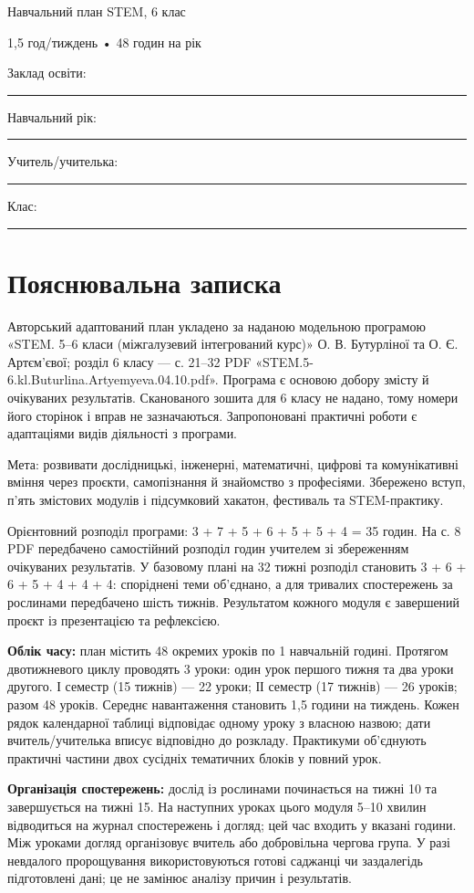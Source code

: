 \documentclass[10pt,a4paper,landscape]{article}
\begin{document}
{\LARGE\color{accent} Навчальний план STEM, 6 клас}

{\large 1,5 год/тиждень • 48 годин на рік}

Заклад освіти: \rule{90mm}{0.3pt}\quad Навчальний рік: \rule{30mm}{0.3pt}

Учитель/учителька: \rule{95mm}{0.3pt}\quad Клас: \rule{25mm}{0.3pt}
\section*{Пояснювальна записка}
Авторський адаптований план укладено за наданою модельною програмою «STEM. 5--6 класи (міжгалузевий інтегрований курс)» О. В. Бутурліної та О. Є. Артєм’євої; розділ 6 класу — с. 21--32 PDF «STEM.5-6.kl.Buturlina.Artyemyeva.04.10.pdf». Програма є основою добору змісту й очікуваних результатів. Сканованого зошита для 6 класу не надано, тому номери його сторінок і вправ не зазначаються. Запропоновані практичні роботи є адаптаціями видів діяльності з програми.

Мета: розвивати дослідницькі, інженерні, математичні, цифрові та комунікативні вміння через проєкти, самопізнання й знайомство з професіями. Збережено вступ, п’ять змістових модулів і підсумковий хакатон, фестиваль та STEM-практику.

Орієнтовний розподіл програми: 3 + 7 + 5 + 6 + 5 + 5 + 4 = 35 годин. На с. 8 PDF передбачено самостійний розподіл годин учителем зі збереженням очікуваних результатів. У базовому плані на 32 тижні розподіл становить 3 + 6 + 6 + 5 + 4 + 4 + 4: споріднені теми об’єднано, а для тривалих спостережень за рослинами передбачено шість тижнів. Результатом кожного модуля є завершений проєкт із презентацією та рефлексією.

\textbf{Облік часу:} план містить 48 окремих уроків по 1 навчальній годині. Протягом двотижневого циклу проводять 3 уроки: один урок першого тижня та два уроки другого. І семестр (15 тижнів) — 22 уроки; ІІ семестр (17 тижнів) — 26 уроків; разом 48 уроків. Середнє навантаження становить 1,5 години на тиждень. Кожен рядок календарної таблиці відповідає одному уроку з власною назвою; дати вчитель/учителька вписує відповідно до розкладу. Практикуми об’єднують практичні частини двох сусідніх тематичних блоків у повний урок.

\textbf{Організація спостережень:} дослід із рослинами починається на тижні 10 та завершується на тижні 15. На наступних уроках цього модуля 5--10 хвилин відводиться на журнал спостережень і догляд; цей час входить у вказані години. Між уроками догляд організовує вчитель або добровільна чергова група. У разі невдалого пророщування використовуються готові саджанці чи заздалегідь підготовлені дані; це не замінює аналізу причин і результатів.
\end{document}
